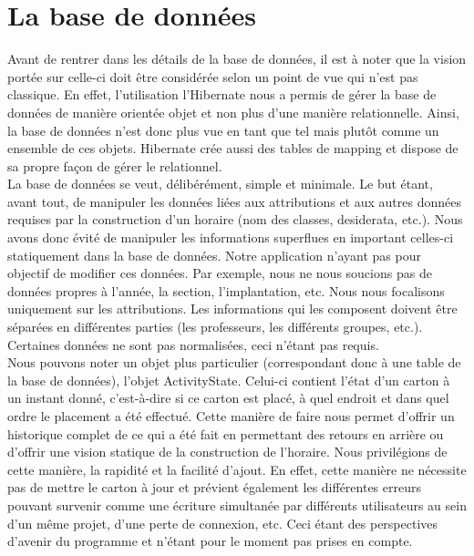 \chapter{La base de données}

Avant de rentrer dans les détails de la base de données, il est à noter que la vision portée sur celle-ci doit être considérée selon un point de vue qui n'est pas classique. En effet, l'utilisation l'Hibernate nous a permis de gérer la base de données de manière orientée objet et non plus d'une manière relationnelle. Ainsi, la base de données n'est donc plus vue en tant que tel mais plutôt comme un ensemble de ces objets. Hibernate crée aussi des tables de mapping et dispose de sa propre façon de gérer le relationnel.\\
\newline
\indent
La base de données se veut, délibérément, simple et minimale. Le but étant, avant tout, de manipuler les données liées aux attributions et aux autres données requises par la construction d'un horaire (nom des classes, desiderata, etc.). Nous avons donc évité de manipuler les informations superflues en important celles-ci statiquement dans la base de données. Notre application n'ayant pas pour objectif de modifier ces données.
\newline
\indent
Par exemple, nous ne nous soucions pas de données propres à l'année, la section, l'implantation, etc. Nous nous focalisons uniquement sur les attributions. Les informations qui les composent doivent être séparées en différentes parties (les professeurs, les différents groupes, etc.). Certaines données ne sont pas normalisées, ceci n'étant pas requis.\\
\newline
\indent
Nous pouvons noter un objet plus particulier (correspondant donc à une table de la base de données), l'objet ActivityState. Celui-ci contient l'état d'un carton à un instant donné, 
c'est-à-dire si ce carton est placé, à quel endroit et dans quel ordre le placement a été effectué.  Cette manière de faire nous permet d'offrir un historique complet de ce qui a été fait en permettant des retours en arrière ou d'offrir une vision statique de la construction de l'horaire. 
\newline
\indent
Nous privilégions de cette manière,  la rapidité et la facilité d'ajout. En effet, cette manière ne nécessite pas de mettre le carton à jour et prévient également les différentes erreurs pouvant survenir comme une écriture simultanée par différents utilisateurs au sein d'un même projet, d'une perte de connexion, etc. Ceci étant des perspectives d'avenir du programme et n'étant pour le moment pas prises en compte.\\
